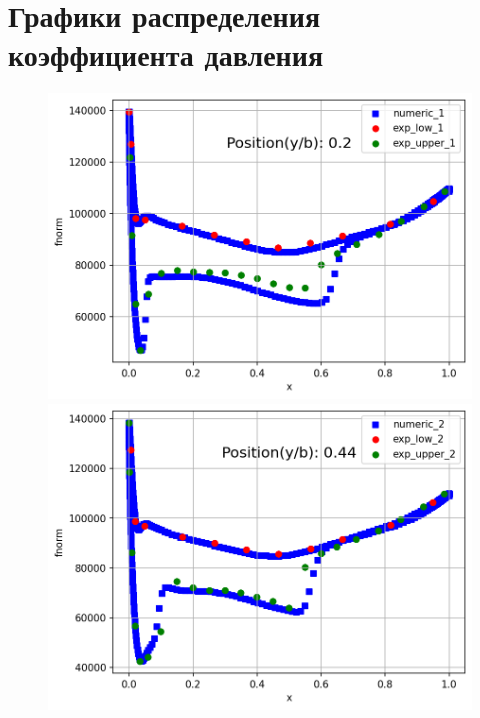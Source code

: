 \documentclass[11pt]{article}
\begin{document}
\section*{Графики распределения коэффициента давления}
\begin{figure}[h!]
\begin{minipage}{.49\textwidth}
    \centering
    \includegraphics[width = 1\textwidth]{1.png}
\end{minipage}
\begin{minipage}{.49\textwidth}
    \centering
    \includegraphics[width = 1\textwidth]{2.png}
\end{minipage}
\begin{minipage}{.49\textwidth}
    \centering

\end{minipage}
\end{figure}
\end{document}
